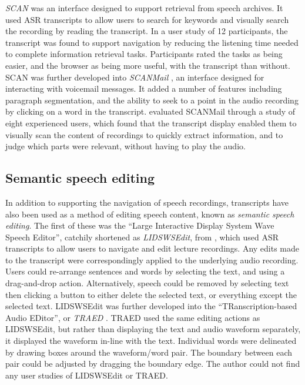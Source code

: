 \textit{SCAN} \citep{Whittaker1999} was an interface designed to support retrieval from speech archives. It used ASR
transcripts to allow users to search for keywords and visually search the recording by reading the transcript.  In a
user study of 12 participants, the transcript was found to support navigation by reducing the listening time needed to
complete information retrieval tasks. Participants rated the tasks as being easier, and the browser as being more
useful, with the transcript than without.  SCAN was further developed into \textit{SCANMail} \citep{Whittaker2002}, an
interface designed for interacting with voicemail messages.  It added a number of features including paragraph
segmentation, and the ability to seek to a point in the audio recording by clicking on a word in the transcript.
\citet{Whittaker2002} evaluated SCANMail through a study of eight experienced users, which found that the transcript
display enabled them to visually scan the content of recordings to quickly extract information, and to judge which
parts were relevant, without having to play the audio.

\subsection{Semantic speech editing}\label{sec:background-semantic-editing}
In addition to supporting the navigation of speech recordings, transcripts have also been used as a method of editing
speech content, known as \textit{semantic speech editing}. The first of these was the ``Large Interactive Display
System Wave Speech Editor'', catchily shortened as \textit{LIDSWSEdit}, from \citet{Apperley2002}, which used ASR
transcripts to allow users to navigate and edit lecture recordings.  Any edits made to the transcript were
correspondingly applied to the underlying audio recording. Users could re-arrange sentences and words by selecting the
text, and using a drag-and-drop action.  Alternatively, speech could be removed by selecting text then clicking a
button to either delete the selected text, or everything except the selected text.  LIDSWSEdit was further developed
into the ``TRanscription-based Audio EDitor'', or \textit{TRAED} \citep{Masoodian2006}.  TRAED used the same editing
actions as LIDSWSEdit, but rather than displaying the text and audio waveform separately, it displayed the waveform
in-line with the text. Individual words were delineated by drawing boxes around the waveform/word pair. The boundary
between each pair could be adjusted by dragging the boundary edge.  The author could not find any user studies of
LIDSWSEdit or TRAED.

